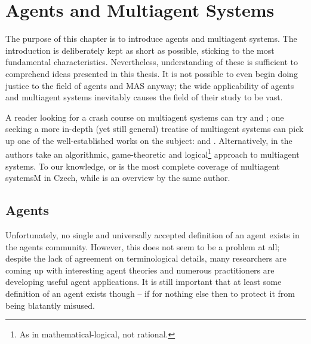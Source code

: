 
\chapter{Agents and Multiagent Systems}

The purpose of this chapter is to introduce agents and multiagent systems.
The introduction is deliberately kept as short as possible, sticking to the most fundamental characteristics.
Nevertheless, understanding of these is sufficient to comprehend ideas presented in this thesis.
It is not possible to even begin doing justice to the field of agents and MAS anyway; the wide applicability of agents and multiagent systems inevitably causes the field of their study to be vast.

A reader looking for a crash course on multiagent systems can try \cite{Wooldridge02} and \cite{Wooldridge95}; one seeking a more in-depth (yet still general) treatise of multiagent systems can pick up one of the well-established works on the subject: \cite{Wooldridge09} and \cite{Weiss99}.
Alternatively, in \cite{Shoham08} the authors take an algorithmic, game-theoretic and logical\footnote{As in mathematical-logical, not rational.} approach to multiagent systems.
To our knowledge, \cite{Kubik04} or \cite{Kubik00} is the most complete coverage of multiagent systemsM in Czech, while \cite{Kubik03} is an overview by the same author.

\section{Agents}

Unfortunately, no single and universally accepted definition of an agent exists in the agents community.
However, this does not seem to be a problem at all; despite the lack of agreement on terminological details, many researchers are coming up with interesting agent theories and numerous practitioners are developing useful agent applications.
It is still important that at least some definition of an agent exists though -- if for nothing else then to protect it from being blatantly misused.

